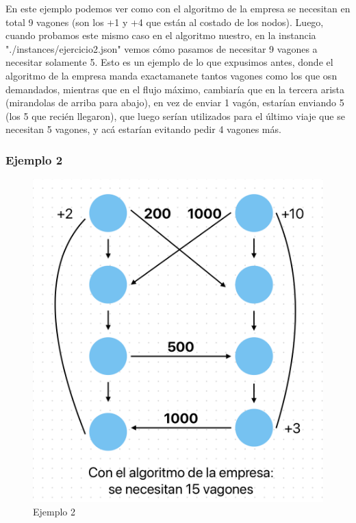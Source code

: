 \documentclass{article}
\begin{document}
En este ejemplo podemos ver como con el algoritmo de la empresa se necesitan en total 9 vagones (son los +1 y +4 que están al costado de los nodos). Luego, cuando probamos este mismo caso en el algoritmo nuestro, en la instancia "./instances/ejercicio2.json" vemos cómo pasamos de necesitar 9 vagones a necesitar solamente 5. Esto es un ejemplo de lo que expusimos antes, donde el algoritmo de la empresa manda exactamanete tantos vagones como los que osn demandados, mientras que en el flujo máximo, cambiaría que en la tercera arista (mirandolas de arriba para abajo), en vez de enviar 1 vagón, estarían enviando 5 (los 5 que recién llegaron), que luego serían utilizados para el último viaje que se necesitan 5 vagones, y acá estarían evitando pedir 4 vagones más. 

\subsubsection{Ejemplo 2}

\begin{figure}[h!]
    \raggedright
    \centering

    \includegraphics[scale=0.35]{im2.jpg}
    \caption{Ejemplo 2}

    \label{fig:ejemplo}
\end{figure}
\end{document}
